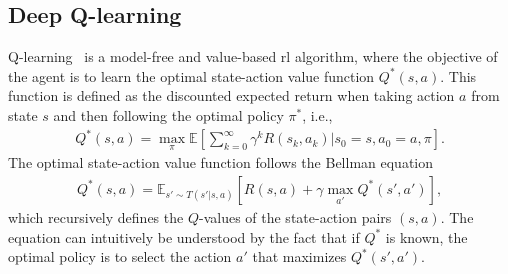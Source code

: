 
\subsection{Deep Q-learning}
\label{ch:q-learning}
Q-learning~\cite{Watkins1992} is a model-free and value-based \gls{rl} algorithm, where the objective of the agent is to learn the optimal state-action value function $Q^*(s,a)$. This function is defined as the discounted expected return when taking action $a$ from state $s$ and then following the optimal policy $\pi^*$, i.e.,
%
\begin{align}
     Q^*(s,a) = \max_\pi \mathbb{E} \left[ \sum_{k=0}^\infty \gamma^k R(s_k, a_k) | s_0 = s, a_0 = a, \pi\right].
\end{align}
The optimal state-action value function follows the Bellman equation
\begin{align}
    Q^*(s,a) = \mathbb{E}_{s' \sim T(s'|s,a)}\left[R(s,a) + \gamma \max_{a'} Q^*(s',a')\right],
\end{align}
%
which recursively defines the $Q$-values of the state-action pairs $(s,a)$. The equation can intuitively be understood by the fact that if $Q^*$ is known, the optimal policy is to select the action $a'$ that maximizes $Q^*(s',a')$.


